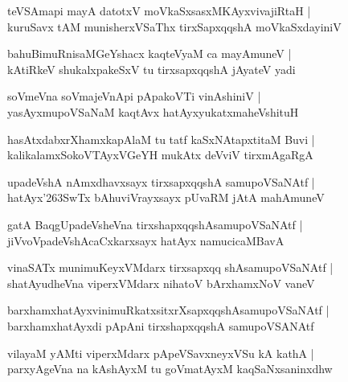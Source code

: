 \documentclass[twoside,12pt,openright]{book}
\def\S{\char'263}
\newcounter{shloka}[chapter]
\begin{document}
\begin{shloka}%
teVSAmapi mayA datotxV moVkaSxsasxMKAyxvivajiRtaH |\\
kuruSavx tAM munisherxVSaThx tirxSapxqqshA moVkaSxdayiniV
\end{shloka}

\begin{shloka}%
bahuBimuRnisaMGeYshacx kaqteVyaM ca mayAmuneV |\\
kAtiRkeV shukalxpakeSxV tu tirxsapxqqshA jAyateV yadi
\end{shloka}

\begin{shloka}%
soVmeVna soVmajeVnApi pApakoVTi vinAshiniV |\\
yasAyxmupoVSaNaM kaqtAvx hatAyxyukatxmaheVshituH 
\end{shloka}

\begin{shloka}%
hasAtxdabxrXhamxkapAlaM tu tatf kaSxNAtapxtitaM Buvi |\\
kalikalamxSokoVTAyxVGeYH mukAtx deVviV tirxmAgaRgA
\end{shloka}

\begin{shloka}%
upadeVshA nAmxdhavxsayx tirxsapxqqshA samupoVSaNAtf |\\
hatAyx\S SwTx bAhuviVrayxsayx pUvaRM jAtA mahAmuneV 
\end{shloka}

\begin{shloka}%
gatA BaqgUpadeVsheVna tirxshapxqqshAsamupoVSaNAtf |\\
jiVvoVpadeVshAcaCxkarxsayx hatAyx namucicaMBavA 
\end{shloka}

\begin{shloka}%
vinaSATx munimuKeyxVMdarx tirxsapxqq shAsamupoVSaNAtf |\\
shatAyudheVna viperxVMdarx nihatoV bArxhamxNoV vaneV
\end{shloka}

\begin{shloka}%
barxhamxhatAyxvinimuRkatxsitxrXsapxqqshAsamupoVSaNAtf |\\
barxhamxhatAyxdi pApAni tirxshapxqqshA samupoVSANAtf 
\end{shloka}

\begin{shloka}%
vilayaM yAMti viperxMdarx pApeVSavxneyxVSu kA kathA |\\
parxyAgeVna na kAshAyxM tu goVmatAyxM kaqSaNxsaninxdhw 
\end{shloka}
\end{document}
